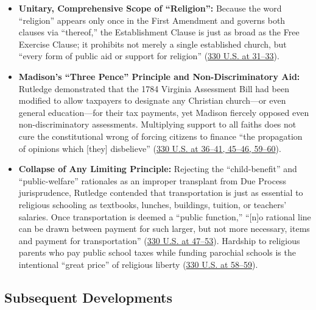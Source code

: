 \documentclass[12pt]{article}
\begin{document}
\begin{itemize}
  \item \textbf{Unitary, Comprehensive Scope of ``Religion'':} Because the word ``religion'' appears only once in the First Amendment and governs both clauses via ``thereof,'' the Establishment Clause is just as broad as the Free Exercise Clause; it prohibits not merely a single established church, but ``every form of public aid or support for religion'' (\href{https://supreme.justia.com/cases/federal/us/330/1/}{330 U.S. at 31--33}).
  \item \textbf{Madison's ``Three Pence'' Principle and Non-Discriminatory Aid:} Rutledge demonstrated that the 1784 Virginia Assessment Bill had been modified to allow taxpayers to designate any Christian church---or even general education---for their tax payments, yet Madison fiercely opposed even non-discriminatory assessments. Multiplying support to all faiths does not cure the constitutional wrong of forcing citizens to finance ``the propagation of opinions which [they] disbelieve'' (\href{https://supreme.justia.com/cases/federal/us/330/1/}{330 U.S. at 36--41, 45--46, 59--60}).
  \item \textbf{Collapse of Any Limiting Principle:} Rejecting the ``child-benefit'' and ``public-welfare'' rationales as an improper transplant from Due Process jurisprudence, Rutledge contended that transportation is just as essential to religious schooling as textbooks, lunches, buildings, tuition, or teachers' salaries. Once transportation is deemed a ``public function,'' ``[n]o rational line can be drawn between payment for such larger, but not more necessary, items and payment for transportation'' (\href{https://supreme.justia.com/cases/federal/us/330/1/}{330 U.S. at 47--53}). Hardship to religious parents who pay public school taxes while funding parochial schools is the intentional ``great price'' of religious liberty (\href{https://supreme.justia.com/cases/federal/us/330/1/}{330 U.S. at 58--59}).
\end{itemize}

\subsection{Subsequent Developments}
\end{document}
